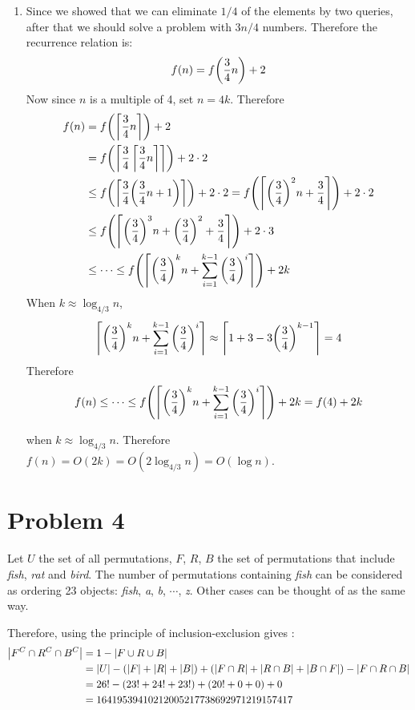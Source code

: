 \documentclass[10pt]{article}
\begin{document}
\begin{enumerate}[leftmargin=*]
    \item Since we showed that we can eliminate $1/4$ of the elements by two queries, after that we should solve a problem with $3n/4$ numbers. Therefore the recurrence relation is:
    $$f(n) = f\qty(\frac{3}{4}n) + 2$$
    Now since $n$ is a multiple of 4, set $n = 4k$. Therefore
    \begin{align*}
        f(n) &= f\qty(\left\lceil\frac{3}{4}n\right\rceil) + 2 \\
        &= f\qty(\left\lceil\frac{3}{4}\left\lceil\frac{3}{4}n\right\rceil\right\rceil) + 2\cdot2 \\
        &\leq f\qty(\left\lceil\frac{3}{4}\qty(\frac{3}{4}n + 1)\right\rceil) + 2\cdot2 = f\qty(\left\lceil\qty(\frac{3}{4})^2n + \frac{3}{4}\right\rceil) + 2\cdot2 \\
        &\leq f\qty(\left\lceil\qty(\frac{3}{4})^3n + \qty(\frac{3}{4})^2 + \frac{3}{4}\right\rceil) + 2\cdot3 \\
        &\leq \cdots \leq f\qty(\left\lceil\qty(\frac{3}{4})^kn + \sum_{i=1}^{k-1}\qty(\frac{3}{4})^i\right\rceil) + 2k
    \end{align*}
    When $k \approx \log_{4/3}{n}$, 
    $$\left\lceil\qty(\frac{3}{4})^kn + \sum_{i=1}^{k-1}\qty(\frac{3}{4})^i\right\rceil \approx \left\lceil{1 + 3 - 3\qty(\frac{3}{4})^{k-1}}\right\rceil = 4$$
    Therefore 
    $$f(n) \leq \cdots \leq f\qty(\left\lceil\qty(\frac{3}{4})^kn + \sum_{i=1}^{k-1}\qty(\frac{3}{4})^i\right\rceil) + 2k = f(4) + 2k$$

    when $k \approx \log_{4/3}{n}$. Therefore $f(n) = O(2k) = O(2\log_{4/3}{n}) = O(\log n)$.
\end{enumerate}

\section*{Problem 4}
Let $U$ the set of all permutations, $F$, $R$, $B$ the set of permutations that include \textit{fish}, \textit{rat} and \textit{bird}.
The number of permutations containing \textit{fish} can be considered as ordering 23 objects: \textit{fish}, \textit{a}, \textit{b}, $\cdots$, \textit{z}. 
Other cases can be thought of as the same way.

\vspace{1mm}
Therefore, using the principle of inclusion-exclusion gives :
\begin{align*}
    \qty|F^C \cap R^C \cap B^C| &= 1 - \qty|F \cup R \cup B| \\
    &= \qty|U| - \qty(\qty|F| + \qty|R| + \qty|B|) + \qty(\qty|F \cap R| + \qty|R \cap B| + \qty|B \cap F|) - \qty|F \cap R \cap B| \\
    &= 26! - \qty(23! + 24! + 23!) + (20! + 0 + 0) + 0 \\
    &= 16419539410212005217738692971219157417
\end{align*}
\end{document}

